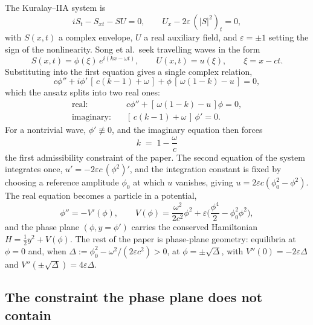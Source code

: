 \documentclass[11pt]{article}
\theoremstyle{definition}
\theoremstyle{remark}
\begin{document}
The Kuralay--IIA system is
\begin{equation}
  iS_t - S_{xt} - SU = 0, \qquad U_x - 2\varepsilon\,(|S|^2)_t = 0,
  \label{eq:kuralay}
\end{equation}
with $S(x,t)$ a complex envelope, $U$ a real auxiliary field, and $\varepsilon=\pm1$ setting the sign of the nonlinearity. Song et al.\ seek travelling waves in the form
\begin{equation}
  S(x,t)=\phi(\xi)\,e^{i(kx-\omega t)},\qquad U(x,t)=u(\xi),\qquad \xi=x-ct.
  \label{eq:ansatz}
\end{equation}
Substituting into the first equation gives a single complex relation,
\[
  c\phi'' + i\phi'\,[\,c(k-1)+\omega\,] + \phi\,[\,\omega(1-k)-u\,] = 0 ,
\]
which the ansatz splits into two real ones:
\begin{align}
  \text{real:}\quad & c\phi'' + [\,\omega(1-k)-u\,]\phi = 0, \label{eq:real}\\
  \text{imaginary:}\quad & [\,c(k-1)+\omega\,]\,\phi' = 0. \label{eq:imag}
\end{align}
For a nontrivial wave, $\phi'\not\equiv0$, and the imaginary equation then forces
\begin{equation}
  \boxed{\,k \;=\; 1-\frac{\omega}{c}\,}
  \label{eq:gate1}
\end{equation}
the first admissibility constraint of the paper. The second equation of the system integrates once, $u' = -2\varepsilon c\,(\phi^2)'$, and the integration constant is fixed by choosing a reference amplitude $\phi_0$ at which $u$ vanishes, giving $u=2\varepsilon c(\phi_0^2-\phi^2)$. The real equation becomes a particle in a potential,
\begin{equation}
  \phi'' = -V'(\phi),\qquad V(\phi)=\frac{\omega^2}{2c^2}\phi^2+\varepsilon\Big(\frac{\phi^4}{2}-\phi_0^2\phi^2\Big),
  \label{eq:potential}
\end{equation}
and the phase plane $(\phi,y=\phi')$ carries the conserved Hamiltonian $H=\tfrac12y^2+V(\phi)$. The rest of the paper is phase-plane geometry: equilibria at $\phi=0$ and, when $\Delta:=\phi_0^2-\omega^2/(2\varepsilon c^2)>0$, at $\phi=\pm\sqrt{\Delta}$, with $V''(0)=-2\varepsilon\Delta$ and $V''(\pm\sqrt\Delta)=4\varepsilon\Delta$.

\subsection{The constraint the phase plane does not contain}
\end{document}
